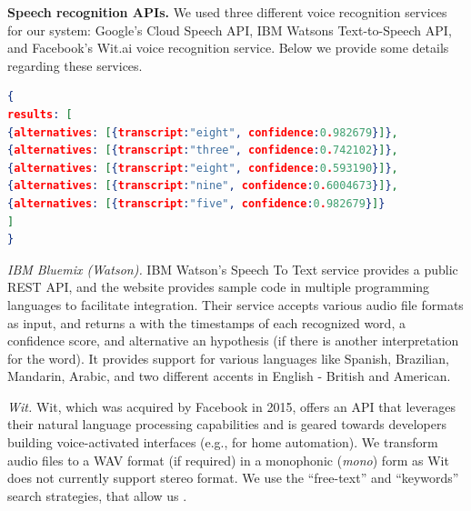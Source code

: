 
\textbf{Speech recognition APIs.}
We used three different voice recognition services for our system: Google's Cloud Speech API,
IBM Watsons Text-to-Speech API, and Facebook's Wit.ai voice recognition service. Below we 
provide some details regarding these services.

\begin{lstlisting}[language=json,firstnumber=1,caption={Example response from IBM Watson's API for an audio challenge from Google \re v2.a.},label={lst:IBM}]
{
results: [
{alternatives: [{transcript:"eight", confidence:0.982679}]},
{alternatives: [{transcript:"three", confidence:0.742102}]},
{alternatives: [{transcript:"eight", confidence:0.593190}]},
{alternatives: [{transcript:"nine", confidence:0.6004673}]},
{alternatives: [{transcript:"five", confidence:0.982679}]}
]
}

\end{lstlisting}

\emph{IBM Bluemix (Watson).} IBM Watson's Speech To Text service provides a public REST API, and the website provides 
sample code in multiple programming languages to facilitate integration.
Their service accepts various audio file formats as input, and returns a 
with the timestamps of each recognized word, a confidence score, and alternative an hypothesis (if there is 
another interpretation for the word). It provides support for various languages 
like Spanish, Brazilian, Mandarin, Arabic, and two different accents in English - British and American.

\emph{Wit.} Wit, which was acquired by Facebook in 2015, offers an API that leverages their natural language processing
capabilities and is geared towards developers building voice-activated interfaces (e.g., for home automation). We transform 
audio files to a WAV format (if required) in a monophonic (\emph{mono}) form as Wit does not currently support stereo format.
We use the ``free-text'' and ``keywords'' search strategies, that allow us .

